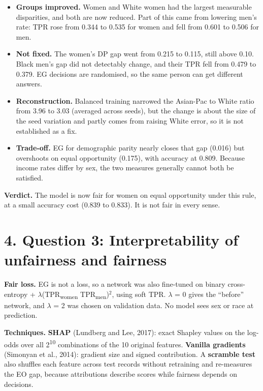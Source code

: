 \documentclass[10pt,a4paper]{article}
\begin{document}
\begin{itemize}
  \item \textbf{Groups improved.} Women and White women had the largest measurable disparities, and both are now reduced. Part of this came from lowering men's rate: TPR rose from 0.344 to 0.535 for women and fell from 0.601 to 0.506 for men.
  \item \textbf{Not fixed.} The women's DP gap went from \textminus{}0.215 to \textminus{}0.115, still above 0.10. Black men's gap did not detectably change, and their TPR fell from 0.479 to 0.379. EG decisions are randomised, so the same person can get different answers.
  \item \textbf{Reconstruction.} Balanced training narrowed the Asian-Pac to White ratio from 3.96 to 3.03 (averaged across seeds), but the change is about the size of the seed variation and partly comes from raising White error, so it is not established as a fix.
  \item \textbf{Trade-off.} EG for demographic parity nearly closes that gap (\textminus{}0.016) but overshoots on equal opportunity (0.175), with accuracy at 0.809. Because income rates differ by sex, the two measures generally cannot both be satisfied.
\end{itemize}

\textbf{Verdict.} The model is now fair for women on equal opportunity under this rule, at a small accuracy cost (0.839 to 0.833). It is not fair in every sense.

\section*{4. Question 3: Interpretability of unfairness and fairness}

\noindent{}

\textbf{Fair loss.} EG is not a loss, so a network was also fine-tuned on binary cross-entropy + $\lambda$(TPR\textsubscript{women} \textminus{} TPR\textsubscript{men})$^2$, using soft TPR. $\lambda$ = 0 gives the ``before'' network, and $\lambda$ = 2 was chosen on validation data. No model sees sex or race at prediction.

\textbf{Techniques.} \textbf{SHAP} (Lundberg and Lee, 2017): exact Shapley values on the log-odds over all 2\textsuperscript{10} combinations of the 10 original features. \textbf{Vanilla gradients} (Simonyan et al., 2014): gradient size and signed contribution. A \textbf{scramble test} also shuffles each feature across test records without retraining and re-measures the EO gap, because attributions describe scores while fairness depends on decisions.
\end{document}
